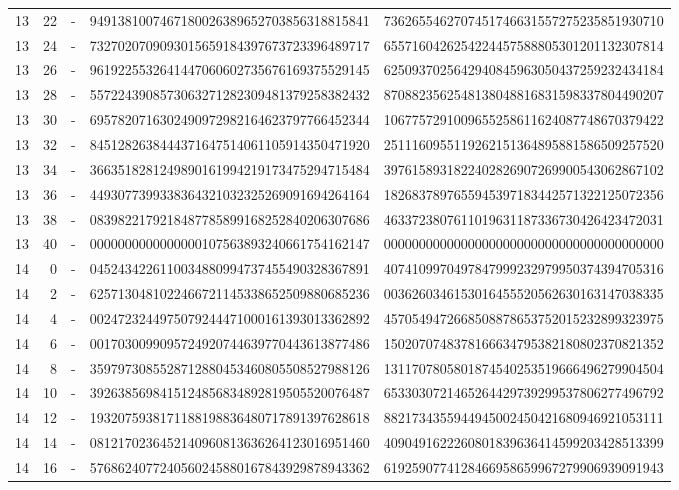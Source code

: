 \begin{longtable}{rrrll}
13 & 22 & - & 9491381007467180026389652703856318815841 & 7362655462707451746631557275235851930710 \\
13 & 24 & - & 7327020709093015659184397673723396489717 & 6557160426254224457588805301201132307814 \\
13 & 26 & - & 9619225532641447060602735676169375529145 & 6250937025642940845963050437259232434184 \\
13 & 28 & - & 5572243908573063271282309481379258382432 & 8708823562548138048816831598337804490207 \\
13 & 30 & - & 6957820716302490972982164623797766452344 & 1067757291009655258611624087748670379422 \\
13 & 32 & - & 8451282638444371647514061105914350471920 & 2511160955119262151364895881586509257520 \\
13 & 34 & - & 3663518281249890161994219173475294715484 & 3976158931822402826907269900543062867102 \\
13 & 36 & - & 4493077399338364321032325269091694264164 & 1826837897655945397183442571322125072356 \\
13 & 38 & - & 0839822179218487785899168252840206307686 & 4633723807611019631187336730426423472031 \\
13 & 40 & - & 0000000000000000107563893240661754162147 & 0000000000000000000000000000000000000000 \\
14 & 0 & - & 0452434226110034880994737455490328367891 & 4074109970497847999232979950374394705316 \\
14 & 2 & - & 6257130481022466721145338652509880685236 & 0036260346153016455520562630163147038335 \\
14 & 4 & - & 0024723244975079244471000161393013362892 & 4570549472668508878653752015232899323975 \\
14 & 6 & - & 0017030099095724920744639770443613877486 & 1502070748378166634795382180802370821352 \\
14 & 8 & - & 3597973085528712880453460805508527988126 & 1311707805801874540253519666496279904504 \\
14 & 10 & - & 3926385698415124856834892819505520076487 & 6533030721465264429739299537806277496792 \\
14 & 12 & - & 1932075938171188198836480717891397628618 & 8821734355944945002450421680946921053111 \\
14 & 14 & - & 0812170236452140960813636264123016951460 & 4090491622260801839636414599203428513399 \\
14 & 16 & - & 5768624077240560245880167843929878943362 & 6192590774128466958659967279906939091943 \\

\end{longtable}
